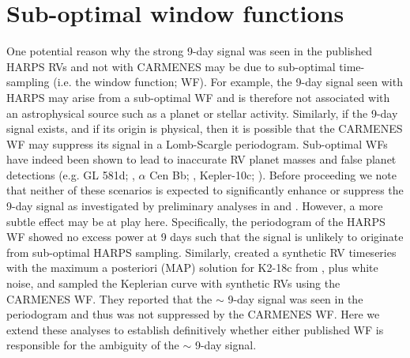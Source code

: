 \section{Sub-optimal window functions} \label{k2182sect:sampling}
One potential reason why the strong 9-day signal was seen in the published HARPS RVs and not with CARMENES may
be due to sub-optimal time-sampling  (i.e. the window function; WF). For example, the 9-day signal seen
with HARPS may arise from a sub-optimal WF and is therefore not associated with an astrophysical source such as a
planet or stellar activity. Similarly, if the 9-day signal exists, and if its origin is physical, then it is possible
that the CARMENES WF may suppress its signal in a Lomb-Scargle periodogram.
Sub-optimal WFs have indeed been shown to lead to inaccurate RV planet
masses and false planet detections (e.g. GL 581d; \citealt{hatzes16}, $\alpha$ Cen Bb; \citealt{rajpaul16},
Kepler-10c; \citealt{rajpaul17}).
Before proceeding we note that neither of these scenarios is
expected to significantly enhance or suppress the 9-day signal as investigated by preliminary analyses in
 and . However, a more subtle effect may be at play here. 
Specifically, the periodogram of the HARPS WF showed no excess
power at 9 days  such that the signal is unlikely to originate from
sub-optimal HARPS sampling. Similarly,
 created a synthetic RV timeseries with the maximum a posteriori (MAP) solution for
K2-18c from , plus white noise, and sampled the Keplerian  curve with synthetic RVs using
the CARMENES WF. They reported that the $\sim$ 9-day signal was seen in the periodogram
and thus was not suppressed by the CARMENES WF. Here we extend these analyses to establish
definitively whether  either published WF is responsible for the ambiguity of the $\sim$ 9-day signal.

